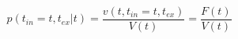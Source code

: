 \begin{equation}
p(t_{in}=t,t_{ex}|t)  = \frac{v(t,t_{in}=t,t_{ex})}{V(t)}= \frac{F(t)}{V(t)}
\end{equation}\begin{equation}

\end{equation}